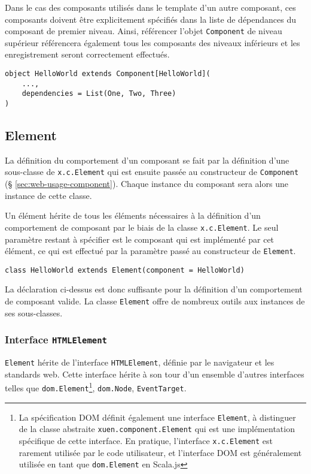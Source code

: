 Dans le cas des composants utilisés dans le template d'un autre composant, ces composants doivent être explicitement spécifiés dans la liste de dépendances du composant de premier niveau. Ainsi, référencer l'objet \texttt{Component} de niveau supérieur référencera également tous les composants des niveaux inférieurs et les enregistrement seront correctement effectués.
\begin{lstlisting}
object HelloWorld extends Component[HelloWorld](
	...,
	dependencies = List(One, Two, Three)
)
\end{lstlisting}

\subsection{Element} \label{sec:web-specs-element}

La définition du comportement d'un composant se fait par la définition d'une sous-classe de \texttt{x.c.Element} qui est ensuite passée au constructeur de \texttt{Component} (§ \ref{sec:web-usage-component}). Chaque instance du composant sera alors une instance de cette classe.

Un élément hérite de tous les éléments nécessaires à la définition d'un comportement de composant par le biais de la classe \texttt{x.c.Element}. Le seul paramètre restant à spécifier est le composant qui est implémenté par cet élément, ce qui est effectué par la paramètre passé au constructeur de \texttt{Element}.
\begin{lstlisting}
class HelloWorld extends Element(component = HelloWorld)
\end{lstlisting}

La déclaration ci-dessus est donc suffisante pour la définition d'un comportement de composant valide. La classe \texttt{Element} offre de nombreux outils aux instances de ses sous-classes.

\subsubsection{Interface \texttt{HTMLElement}}
\texttt{Element} hérite de l'interface \texttt{HTMLElement}, définie par le navigateur et les standards web. Cette interface hérite à son tour d'un ensemble d'autres interfaces telles que \texttt{dom.Element}\footnote{La spécification DOM définit également une interface \texttt{Element}, à distinguer de la classe abstraite \texttt{xuen.component.Element} qui est une implémentation spécifique de cette interface. En pratique, l'interface \texttt{x.c.Element} est rarement utilisée par le code utilisateur, et l'interface DOM est généralement utilisée en tant que \texttt{dom.Element} en Scala.js}, \texttt{dom.Node}, \texttt{EventTarget}.

